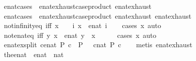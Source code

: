 \begin{isabellebody}
\isanewline
{}\isamarkupfalse%
\ enat{}{\isacharunderscore}cases\ {\isacharequal}\ enat{\isachardot}exhaust{\isacharbrackleft}case{\isacharunderscore}product\ enat{\isachardot}exhaust{\isacharbrackright}\isanewline
{}\isamarkupfalse%
\ enat{}{\isacharunderscore}cases\ {\isacharequal}\ enat{\isachardot}exhaust{\isacharbrackleft}case{\isacharunderscore}product\ enat{\isachardot}exhaust\ enat{\isachardot}exhaust{\isacharbrackright}\isanewline
\isanewline
{}\isamarkupfalse%
\ not{\isacharunderscore}infinity{\isacharunderscore}eq\ {\isacharbrackleft}iff{\isacharbrackright}{\isacharcolon}\ {\isachardoublequoteopen}{\isacharparenleft}x\ {\isasymnoteq}\ {\isasyminfinity}{\isacharparenright}\ {\isacharequal}\ {\isacharparenleft}{\isasymexists}i{\isachardot}\ x\ {\isacharequal}\ enat\ i{\isacharparenright}{\isachardoublequoteclose}\isanewline
%
\isadelimproof
\ \ %
\endisadelimproof
%
\isatagproof
{}\isamarkupfalse%
\ {\isacharparenleft}cases\ x{\isacharparenright}\ auto%
\endisatagproof
{\isafoldproof}%
%
\isadelimproof
\isanewline
%
\endisadelimproof
\isanewline
{}\isamarkupfalse%
\ not{\isacharunderscore}enat{\isacharunderscore}eq\ {\isacharbrackleft}iff{\isacharbrackright}{\isacharcolon}\ {\isachardoublequoteopen}{\isacharparenleft}{\isasymforall}y{\isachardot}\ x\ {\isasymnoteq}\ enat\ y{\isacharparenright}\ {\isacharequal}\ {\isacharparenleft}x\ {\isacharequal}\ {\isasyminfinity}{\isacharparenright}{\isachardoublequoteclose}\isanewline
%
\isadelimproof
\ \ %
\endisadelimproof
%
\isatagproof
{}\isamarkupfalse%
\ {\isacharparenleft}cases\ x{\isacharparenright}\ auto%
\endisatagproof
{\isafoldproof}%
%
\isadelimproof
\isanewline
%
\endisadelimproof
\isanewline
{}\isamarkupfalse%
\ enat{\isacharunderscore}ex{\isacharunderscore}split{\isacharcolon}\ {\isachardoublequoteopen}{\isacharparenleft}{\isasymexists}c{\isacharcolon}{\isacharcolon}enat{\isachardot}\ P\ c{\isacharparenright}\ {\isasymlongleftrightarrow}\ P\ {\isasyminfinity}\ {\isasymor}\ {\isacharparenleft}{\isasymexists}c{\isacharcolon}{\isacharcolon}nat{\isachardot}\ P\ c{\isacharparenright}{\isachardoublequoteclose}\isanewline
%
\isadelimproof
\ \ %
\endisadelimproof
%
\isatagproof
{}\isamarkupfalse%
\ {\isacharparenleft}metis\ enat{\isachardot}exhaust{\isacharparenright}%
\endisatagproof
{\isafoldproof}%
%
\isadelimproof
\isanewline
%
\endisadelimproof
\isanewline
{}\isamarkupfalse%
\ the{\isacharunderscore}enat\ {\isacharcolon}{\isacharcolon}\ {\isachardoublequoteopen}enat\ {\isasymRightarrow}\ nat{\isachardoublequoteclose}\isanewline

\end{isabellebody}
